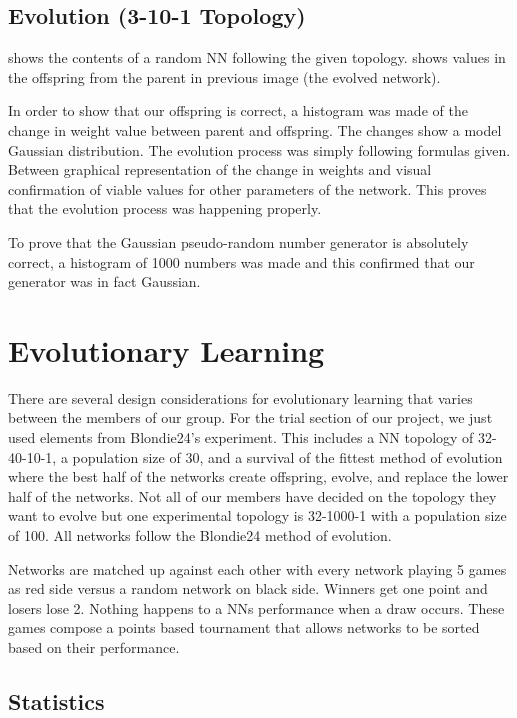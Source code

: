 \documentclass{article}
\begin{document}
\subsection{Evolution (3-10-1 Topology)}

 shows the contents of a random
NN following the given topology.  shows values in the offspring from the
parent in previous image (the evolved network).

In order to show that our offspring is correct, a
histogram was made of the change in weight value between parent and offspring. The
changes show a model Gaussian distribution. The evolution process was simply following formulas
given. Between graphical representation of the change in weights and visual
confirmation of viable values for other parameters of the network. This proves that
the evolution process was happening properly.

To prove that the Gaussian pseudo-random number generator is absolutely correct, 
a histogram of 1000 numbers was made and this confirmed that our generator was in fact Gaussian.

\section{Evolutionary Learning}

There are several design considerations for evolutionary
learning that varies between the members of our group. For the trial section of
our project, we just used elements from Blondie24’s experiment. This includes a
NN topology of 32-40-10-1, a population size of 30, and a survival of the
fittest method of evolution where the best half of the networks create
offspring, evolve, and replace the lower half of the networks. Not all of our
members have decided on the topology they want to evolve but one experimental
topology is 32-1000-1 with a population size of 100. All networks follow the
Blondie24 method of evolution.

Networks are matched up against each other with
every network playing 5 games as red side versus a random network on black
side. Winners get one point and losers lose 2. Nothing happens to a NNs
performance when a draw occurs. These games compose a points based tournament
that allows networks to be sorted based on their performance.

\subsection{Statistics}
\end{document}
